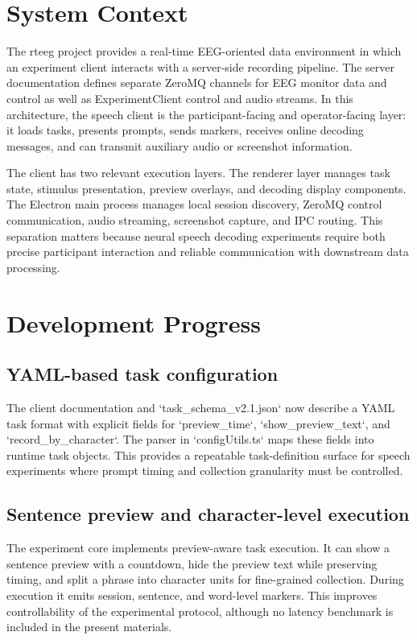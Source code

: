 \documentclass[11pt]{article}
\begin{document}
\section{System Context}
The rteeg project provides a real-time EEG-oriented data environment in which an experiment client interacts with a server-side recording pipeline. The server documentation defines separate ZeroMQ channels for EEG monitor data and control as well as ExperimentClient control and audio streams. In this architecture, the speech client is the participant-facing and operator-facing layer: it loads tasks, presents prompts, sends markers, receives online decoding messages, and can transmit auxiliary audio or screenshot information.

The client has two relevant execution layers. The renderer layer manages task state, stimulus presentation, preview overlays, and decoding display components. The Electron main process manages local session discovery, ZeroMQ control communication, audio streaming, screenshot capture, and IPC routing. This separation matters because neural speech decoding experiments require both precise participant interaction and reliable communication with downstream data processing.

\section{Development Progress}
\subsection{YAML-based task configuration}
The client documentation and `task_schema_v2.1.json` now describe a YAML task format with explicit fields for `preview_time`, `show_preview_text`, and `record_by_character`. The parser in `configUtils.ts` maps these fields into runtime task objects. This provides a repeatable task-definition surface for speech experiments where prompt timing and collection granularity must be controlled.

\subsection{Sentence preview and character-level execution}
The experiment core implements preview-aware task execution. It can show a sentence preview with a countdown, hide the preview text while preserving timing, and split a phrase into character units for fine-grained collection. During execution it emits session, sentence, and word-level markers. This improves controllability of the experimental protocol, although no latency benchmark is included in the present materials.
\end{document}
